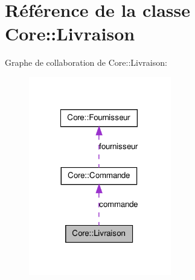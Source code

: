 \hypertarget{class_core_1_1_livraison}{
\section{Référence de la classe Core::Livraison}
\label{df/d27/class_core_1_1_livraison}
}


Graphe de collaboration de Core::Livraison:\nopagebreak
\begin{figure}[H]
\begin{center}
\leavevmode
\includegraphics[width=176pt]{db/def/class_core_1_1_livraison__coll__graph}
\end{center}
\end{figure}
